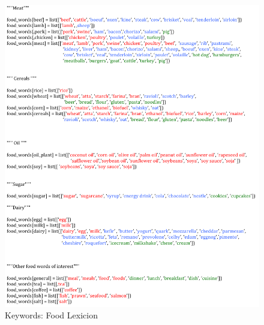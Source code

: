 \documentclass[12pt]{report}
\begin{document}
 \begin{figure}[H]
\centerline{ \noindent\includegraphics[width=1\textwidth]{img/abs/hyrach_lex}}
 \caption{Keywords: Food Lexicion}
 \label{fig:flex}
\end{figure}
\end{document}
